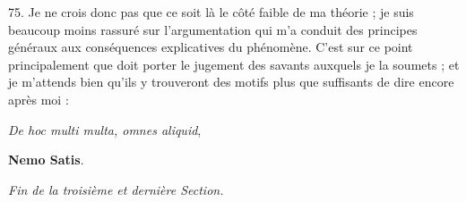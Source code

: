 \documentclass[a4paper, 11pt, oneside, polutonikogreek, french]{article}
\begin{document}
75. Je ne crois donc pas que ce soit là le côté faible de ma théorie ; je suis beaucoup moins rassuré sur l'argumentation qui m'a conduit des principes généraux aux conséquences explicatives du phénomène. C'est sur ce point principalement que doit porter le jugement des savants auxquels je la soumets ; et je m'attends bien qu'ils y trouveront des motifs plus que suffisants de dire encore après moi :

\begin{center}
\emph{De hoc multi multa, omnes aliquid},

\textbf{Nemo Satis}.
\end{center}

\begin{center}
\emph{Fin de la troisième et dernière Section.}
\end{center}
\clearpage
\end{document}
